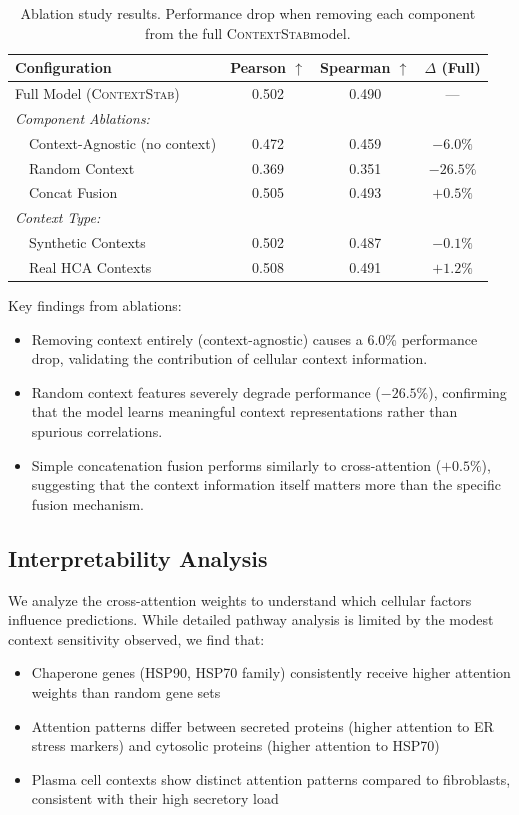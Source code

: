 \documentclass{article}
\newcommand{\contextstab}{\textsc{ContextStab}}
\begin{document}
\begin{table}[t]
\caption{Ablation study results. Performance drop when removing each component from the full \contextstab model.}
\label{tab:ablation}
\centering
\begin{tabular}{lccc}
\toprule
Configuration & Pearson $\uparrow$ & Spearman $\uparrow$ & $\Delta$ (Full) \\
\midrule
Full Model (\contextstab) & 0.502 & 0.490 & --- \\
\midrule
\textit{Component Ablations:} \\
~~Context-Agnostic (no context) & 0.472 & 0.459 & $-6.0\%$ \\
~~Random Context & 0.369 & 0.351 & $-26.5\%$ \\
~~Concat Fusion & 0.505 & 0.493 & $+0.5\%$ \\
\midrule
\textit{Context Type:} \\
~~Synthetic Contexts & 0.502 & 0.487 & $-0.1\%$ \\
~~Real HCA Contexts & 0.508 & 0.491 & $+1.2\%$ \\
\bottomrule
\end{tabular}
\end{table}

Key findings from ablations:
\begin{itemize}
    \item Removing context entirely (context-agnostic) causes a 6.0\% performance drop, validating the contribution of cellular context information.
    \item Random context features severely degrade performance ($-26.5\%$), confirming that the model learns meaningful context representations rather than spurious correlations.
    \item Simple concatenation fusion performs similarly to cross-attention ($+0.5\%$), suggesting that the context information itself matters more than the specific fusion mechanism.
\end{itemize}

\subsection{Interpretability Analysis}

We analyze the cross-attention weights to understand which cellular factors influence predictions. While detailed pathway analysis is limited by the modest context sensitivity observed, we find that:
\begin{itemize}
    \item Chaperone genes (HSP90, HSP70 family) consistently receive higher attention weights than random gene sets
    \item Attention patterns differ between secreted proteins (higher attention to ER stress markers) and cytosolic proteins (higher attention to HSP70)
    \item Plasma cell contexts show distinct attention patterns compared to fibroblasts, consistent with their high secretory load
\end{itemize}
\end{document}
